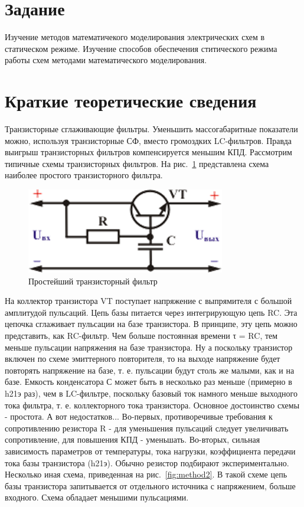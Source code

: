 \documentclass[a4paper,14pt]{article}
\begin{document}

\tableofcontents
\pagebreak

\section{Задание}

Изучение методов математичекого моделирования электрических схем в статическом режиме.
Изучение способов обеспечения ститического режима работы схем методами математического моделирования.

\section{Краткие теоретические сведения}

Транзисторные сглаживающие фильтры.
Уменьшить массогабаритные показатели можно, используя транзисторные СФ, вместо громоздких LC-фильтров. 
Правда выигрыш транзисторных фильтров компенсируется меньшим КПД.
Рассмотрим типичные схемы транзисторных фильтров.
На рис.~\ref{fig:method1} представлена схема наиболее простого транзисторного фильтра.

\begin{figure}[H]
	\centering
	\includegraphics[width=0.5\linewidth]{image/method_1}
	\caption{Простейший транзисторный фильтр}
	\label{fig:method1}
\end{figure}

На коллектор транзистора VT поступает напряжение с выпрямителя с большой амплитудой пульсаций. 
Цепь базы питается через интегрирующую цепь RC. 
Эта цепочка сглаживает пульсации на базе транзистора.
В принципе, эту цепь можно представить, как RC-фильтр.
Чем больше постоянная времени τ = RC, тем меньше пульсации напряжения на базе транзистора.
Ну а поскольку транзистор включен по схеме эмиттерного повторителя, то на выходе напряжение будет повторять напряжение на базе, т. е. пульсации будут столь же малыми, как и на базе.
Емкость конденсатора С может быть в несколько раз меньше (примерно в h21э раз), чем в LC-фильтре, поскольку базовый ток намного меньше выходного тока фильтра, т. е. коллекторного тока транзистора.
Основное достоинство схемы - простота.
А вот недостатков...
Во-первых, противоречивые требования к сопротивлению резистора R - для уменьшения пульсаций следует увеличивать сопротивление, для повышения КПД - уменьшать.
Во-вторых, сильная зависимость параметров от температуры, тока нагрузки, коэффициента передачи тока базы транзистора (h21э).
Обычно резистор подбирают экспериментально.
Несколько иная схема, приведенная на рис.~\ref{fig:method2}.
В такой схеме цепь базы транзистора запитывается от отдельного источника с напряжением, больше входного.
Схема обладает меньшими пульсациями.
\end{document}
